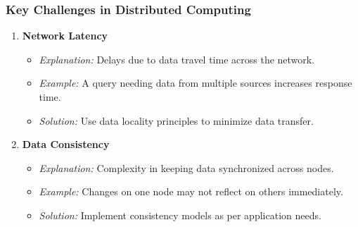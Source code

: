 \documentclass[aspectratio=169]{beamer}
\begin{document}
\begin{frame}[fragile]
    \frametitle{Key Challenges in Distributed Computing}
    \begin{enumerate}
        \item \textbf{Network Latency}
            \begin{itemize}
                \item \textit{Explanation:} Delays due to data travel time across the network.
                \item \textit{Example:} A query needing data from multiple sources increases response time.
                \item \textit{Solution:} Use data locality principles to minimize data transfer.
            \end{itemize}

        \item \textbf{Data Consistency}
            \begin{itemize}
                \item \textit{Explanation:} Complexity in keeping data synchronized across nodes.
                \item \textit{Example:} Changes on one node may not reflect on others immediately.
                \item \textit{Solution:} Implement consistency models as per application needs.
            \end{itemize}
    \end{enumerate}
\end{frame}
\end{document}

